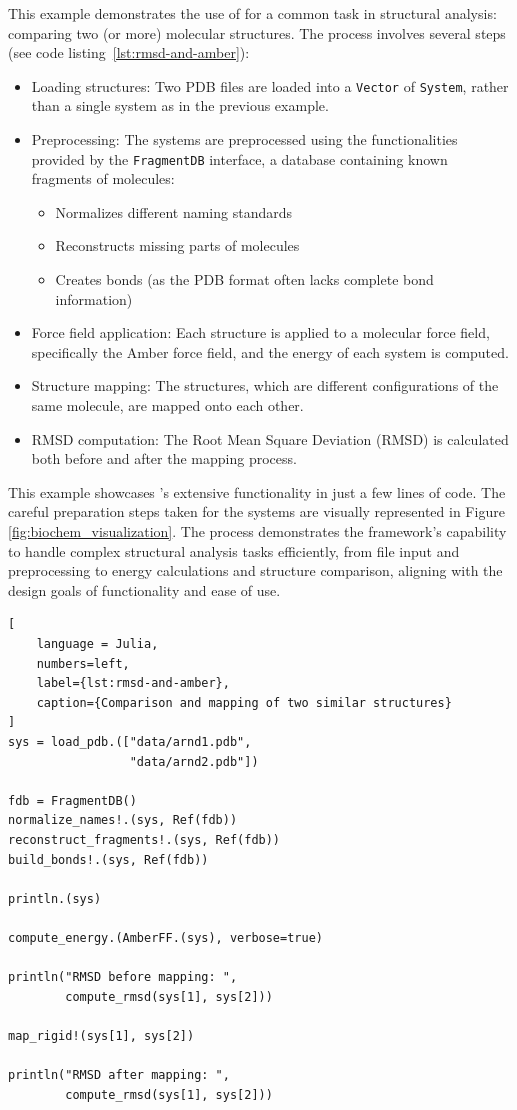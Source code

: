 This example demonstrates the use of \biochem for a common task in structural analysis: comparing two (or more) molecular structures. The process involves several steps (see code listing~\ref{lst:rmsd-and-amber}):
\begin{itemize}
	\item Loading structures: Two PDB files are loaded into a \texttt{Vector} of \texttt{System}, rather than a single system as in the previous example.
	\item Preprocessing: The systems are preprocessed using the functionalities provided by the \texttt{FragmentDB} interface, a database containing known fragments of molecules: 
	\begin{itemize}
		\item Normalizes different naming standards
		\item Reconstructs missing parts of molecules
		\item Creates bonds (as the PDB format often lacks complete bond information)
	\end{itemize}
	\item Force field application: Each structure is applied to a molecular force field, specifically the Amber force field, and the energy of each system is computed.
	\item Structure mapping: The structures, which are different configurations of the same molecule, are mapped onto each other.
	\item RMSD computation: The Root Mean Square Deviation (RMSD) is calculated both before and after the mapping process.
\end{itemize}
This example showcases \biochem's extensive functionality in just a few lines of code. The careful preparation steps taken for the systems are visually represented in Figure \ref{fig:biochem_visualization}. The process demonstrates the framework's capability to handle complex structural analysis tasks efficiently, from file input and preprocessing to energy calculations and structure comparison, aligning with the design goals of functionality and ease of use.

\begin{lstlisting}[
    language = Julia, 
    numbers=left, 
    label={lst:rmsd-and-amber}, 
    caption={Comparison and mapping of two similar structures}
]
sys = load_pdb.(["data/arnd1.pdb", 
				 "data/arnd2.pdb"])

fdb = FragmentDB()
normalize_names!.(sys, Ref(fdb))
reconstruct_fragments!.(sys, Ref(fdb))
build_bonds!.(sys, Ref(fdb))

println.(sys)

compute_energy.(AmberFF.(sys), verbose=true)

println("RMSD before mapping: ", 
		compute_rmsd(sys[1], sys[2]))

map_rigid!(sys[1], sys[2])

println("RMSD after mapping: ", 
		compute_rmsd(sys[1], sys[2]))
\end{lstlisting}

